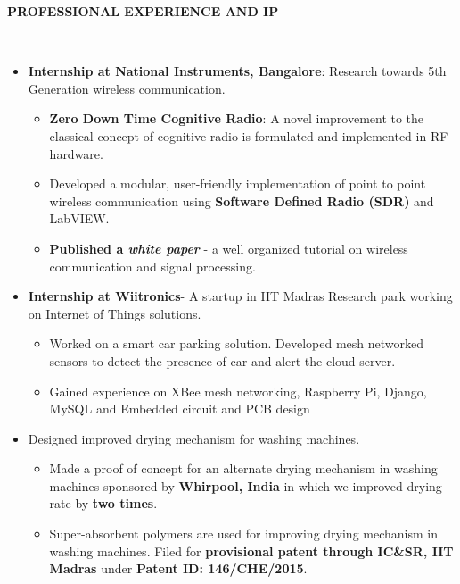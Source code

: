 \documentclass[a4paper,10pt]{article}
\newcommand{\lsep}{-0.5cm}
\newcommand{\resheading}[1]{{\small \colorbox{mygrey}{\begin{minipage}{0.975\textwidth}{\textbf{#1 \vphantom{p\^{E}}}}\end{minipage}}}}
\begin{document}
\resheading{\textbf{PROFESSIONAL EXPERIENCE AND IP} }\\[\lsep]
    \begin{itemize}
            \item \textbf{Internship at National Instruments, Bangalore}: Research towards 5th Generation wireless communication.
        \begin{itemize}
            \vspace{-5pt}
            \item \textbf{Zero Down Time Cognitive Radio}: A novel improvement to the classical concept of cognitive radio is formulated and implemented in RF hardware.
            \item Developed a modular, user-friendly implementation of point to point wireless communication using \textbf{Software Defined Radio (SDR)} and LabVIEW.
            \item \textbf{Published a \textit{white paper}} - a well organized tutorial on wireless communication and signal processing.
        \end{itemize}
        \vspace{-5pt}
        \item \textbf{Internship at Wiitronics}- A startup in IIT Madras Research park working on Internet of Things solutions.
        \vspace{-5pt}
        \begin{itemize}
            \setlength{\itemsep}{1pt}
            \item Worked on a smart car parking solution. Developed mesh networked sensors to detect the presence of car and alert the cloud server.
            \item Gained experience on XBee mesh networking, Raspberry Pi, Django, MySQL and Embedded circuit and PCB design
        \end{itemize}
        \vspace{-5pt}
        \item Designed improved drying mechanism for washing machines.
        \begin{itemize}
            \vspace{-5pt}
            \item Made a proof of concept for an alternate drying mechanism in washing machines sponsored by \textbf{Whirpool, India} in which we improved drying rate by \textbf{two times}.
            \item Super-absorbent polymers are used for improving drying mechanism in washing machines. Filed for \textbf{provisional patent through IC\&SR, IIT Madras} under \textbf{Patent ID: 146/CHE/2015}.
        \end{itemize} 
    \end{itemize}
\end{document}
